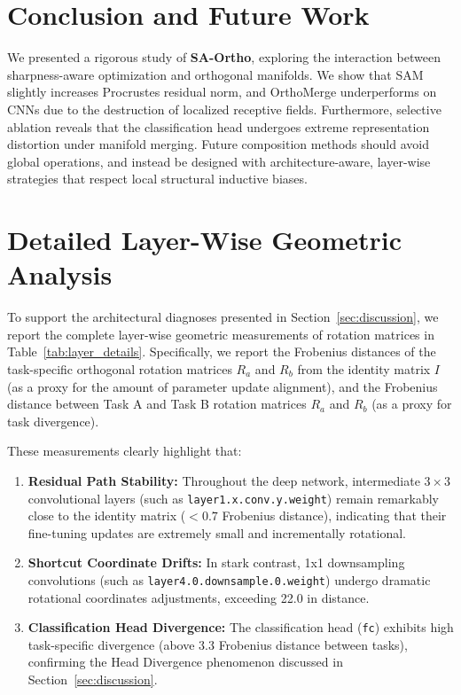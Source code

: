 \documentclass{article}
\begin{document}
\section{Conclusion and Future Work}
\label{sec:conclusion}
We presented a rigorous study of \textbf{SA-Ortho}, exploring the interaction between sharpness-aware optimization and orthogonal manifolds. 
We show that SAM slightly increases Procrustes residual norm, and OrthoMerge underperforms on CNNs due to the destruction of localized receptive fields. 
Furthermore, selective ablation reveals that the classification head undergoes extreme representation distortion under manifold merging. 
Future composition methods should avoid global operations, and instead be designed with architecture-aware, layer-wise strategies that respect local structural inductive biases.

\clearpage



\clearpage
\appendix
\onecolumn
\section{Detailed Layer-Wise Geometric Analysis}
To support the architectural diagnoses presented in Section~\ref{sec:discussion}, we report the complete layer-wise geometric measurements of rotation matrices in Table~\ref{tab:layer_details}. Specifically, we report the Frobenius distances of the task-specific orthogonal rotation matrices $R_a$ and $R_b$ from the identity matrix $I$ (as a proxy for the amount of parameter update alignment), and the Frobenius distance between Task A and Task B rotation matrices $R_a$ and $R_b$ (as a proxy for task divergence).

These measurements clearly highlight that:
\begin{enumerate}
    \item \textbf{Residual Path Stability:} Throughout the deep network, intermediate $3\times 3$ convolutional layers (such as \texttt{layer1.x.conv.y.weight}) remain remarkably close to the identity matrix ($< 0.7$ Frobenius distance), indicating that their fine-tuning updates are extremely small and incrementally rotational.
    \item \textbf{Shortcut Coordinate Drifts:} In stark contrast, 1x1 downsampling convolutions (such as \texttt{layer4.0.downsample.0.weight}) undergo dramatic rotational coordinates adjustments, exceeding 22.0 in distance.
    \item \textbf{Classification Head Divergence:} The classification head (\texttt{fc}) exhibits high task-specific divergence (above 3.3 Frobenius distance between tasks), confirming the Head Divergence phenomenon discussed in Section~\ref{sec:discussion}.
\end{enumerate}
\end{document}
